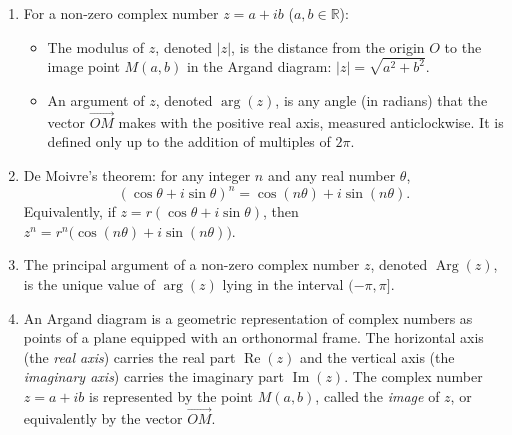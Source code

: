 \documentclass[11pt]{article}
\newcommand{\cle}[1]{{\popxbold\color{popdark}#1}}
\begin{document}
\begin{corrige}
\begin{enumerate}
\item For a non-zero complex number $z = a+ib$ ($a,b\in\mathbb{R}$):
\begin{itemize}
\item The \cle{modulus} of $z$, denoted $|z|$, is the distance from the origin $O$ to the image point $M(a,b)$ in the Argand diagram: $|z| = \sqrt{a^2+b^2}$.
\item An \cle{argument} of $z$, denoted $\arg(z)$, is any angle (in radians) that the vector $\overrightarrow{OM}$ makes with the positive real axis, measured anticlockwise. It is defined only up to the addition of multiples of $2\pi$.
\end{itemize}
\item \cle{De Moivre's theorem}: for any integer $n$ and any real number $\theta$,
\[
(\cos\theta + i\sin\theta)^n = \cos(n\theta) + i\sin(n\theta).
\]
Equivalently, if $z = r(\cos\theta + i\sin\theta)$, then $z^n = r^n\bigl(\cos(n\theta) + i\sin(n\theta)\bigr)$.
\item The \cle{principal argument} of a non-zero complex number $z$, denoted $\operatorname{Arg}(z)$, is the unique value of $\arg(z)$ lying in the interval $(-\pi, \pi]$.
\item An \cle{Argand diagram} is a geometric representation of complex numbers as points of a plane equipped with an orthonormal frame. The horizontal axis (the \emph{real axis}) carries the real part $\operatorname{Re}(z)$ and the vertical axis (the \emph{imaginary axis}) carries the imaginary part $\operatorname{Im}(z)$. The complex number $z = a+ib$ is represented by the point $M(a,b)$, called the \emph{image} of $z$, or equivalently by the vector $\overrightarrow{OM}$.
\end{enumerate}
\end{corrige}
\end{document}

